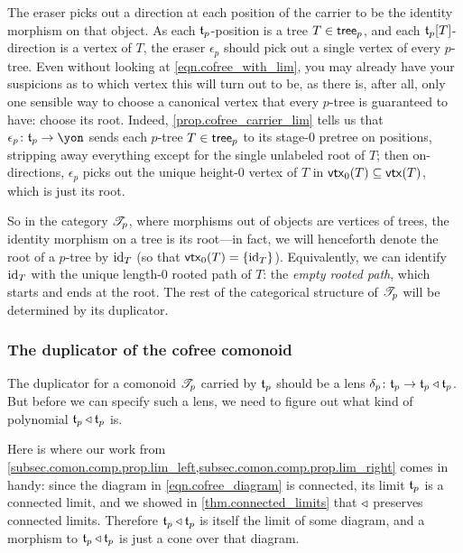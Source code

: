 \documentclass[Book-Poly]{subfiles}
\begin{document}
The eraser picks out a direction at each position of the carrier to be the identity morphism on that object.
As each $\mathfrak{t}_p$-position is a tree $T\in\mathsf{tree}_p$, and each $\mathfrak{t}_p[T]$-direction is a vertex of $T$, the eraser $\epsilon_p$ should pick out a single vertex of every $p$-tree.
Even without looking at \eqref{eqn.cofree_with_lim}, you may already have your suspicions as to which vertex this will turn out to be, as there is, after all, only one sensible way to choose a canonical vertex that every $p$-tree is guaranteed to have: choose its root.
Indeed, \cref{prop.cofree_carrier_lim} tells us that $\epsilon_p\colon\car{t}_p\to\yon$ sends each $p$-tree $T\in\mathsf{tree}_p$ to its stage-$0$ pretree on positions, stripping away everything except for the single unlabeled root of $T$; then on-directions, $\epsilon_p$ picks out the unique height-$0$ vertex of $T$ in $\mathsf{vtx}_0(T)\subseteq\mathsf{vtx}(T)$, which is just its root.

So in the category $\mathscr{T}_{p}$, where morphisms out of objects are vertices of trees, the identity morphism on a tree is its root---in fact, we will henceforth denote the root of a $p$-tree by $\mathrm{id}_T$ (so that $\mathsf{vtx}_0(T)=\{\mathrm{id}_T\}$).
Equivalently, we can identify $\mathrm{id}_T$ with the unique length-$0$ rooted path of $T$: the \emph{empty rooted path}, which starts and ends at the root.
The rest of the categorical structure of $\mathscr{T}_{p}$ will be determined by its duplicator.

\subsubsection{The duplicator of the cofree comonoid}

The duplicator for a comonoid $\mathscr{T}_{p}$ carried by $\mathfrak{t}_p$ should be a lens $\delta_p\colon\mathfrak{t}_p\to\mathfrak{t}_p\mathbin{\triangleleft}\mathfrak{t}_p$.
But before we can specify such a lens, we need to figure out what kind of polynomial $\mathfrak{t}_p\mathbin{\triangleleft}\mathfrak{t}_p$ is.

Here is where our work from \cref{subsec.comon.comp.prop.lim_left,subsec.comon.comp.prop.lim_right} comes in handy: since the diagram in \eqref{eqn.cofree_diagram} is connected, its limit $\mathfrak{t}_p$ is a connected limit, and we showed in \cref{thm.connected_limits} that $\mathbin{\triangleleft}$ preserves connected limits.
Therefore $\mathfrak{t}_p\mathbin{\triangleleft}\mathfrak{t}_p$ is itself the limit of some diagram, and a morphism to $\mathfrak{t}_p\mathbin{\triangleleft}\mathfrak{t}_p$ is just a cone over that diagram.
\end{document}
